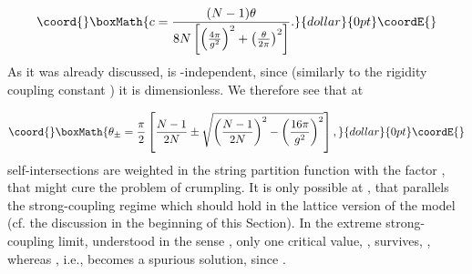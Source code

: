 \documentclass[a4paper,12pt]{article}
\begin{document}
$$\coord{}\boxMath{c=\frac{(N-1)\theta}{8N\left[
\left(\frac{4\pi}{g^2}\right)^2+\left(\frac{\theta}{2\pi}\right)^2\right]}.}{dollar}{0pt}\coordE{}$$
As it was already discussed,
\coordHE{} is \myHighlight{$\Lambda$}\coordHE{}-independent, since (similarly to the rigidity coupling constant \myHighlight{$\alpha$}\coordHE{}) it is
dimensionless. We therefore see that at


$$\coord{}\boxMath{
\theta_{\pm}=\frac{\pi}{2}\left[\frac{N-1}{2N}\pm\sqrt{\left(\frac{N-1}{2N}\right)^2-\left(\frac{16\pi}{g^2}
\right)^2}\right],}{dollar}{0pt}\coordE{}$$
self-intersections are weighted in the string partition function with the factor \coordHE{}, that might
cure the problem of crumpling. It is only possible at \coordHE{}, that parallels the strong-coupling regime which should hold
in the lattice version of the model (cf. the discussion in the beginning of this Section).
In the extreme strong-coupling limit, understood in the sense \coordHE{},
only one critical value, \myHighlight{$\theta_{+}$}\coordHE{}, survives, \coordHE{}, whereas
\coordHE{}, i.e., \myHighlight{$\theta_{-}$}\coordHE{} becomes a spurious solution, since \coordHE{}.
\end{document}
